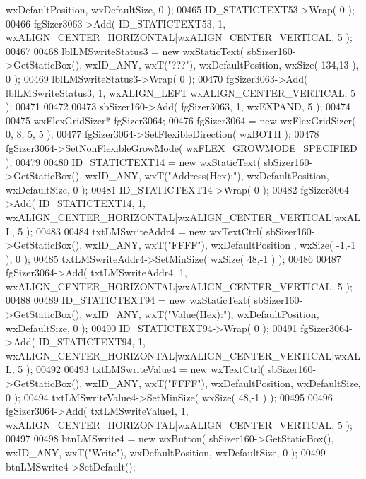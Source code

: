\begin{DoxyCode}
      wxDefaultPosition, wxDefaultSize, 0 );
00465     ID_STATICTEXT53->Wrap( 0 );
00466     fgSizer3063->Add( ID_STATICTEXT53, 1, wxALIGN\_CENTER\_HORIZONTAL|wxALIGN\_CENTER\_VERTICAL, 5 );
00467     
00468     lblLMSwriteStatus3 = \textcolor{keyword}{new} wxStaticText( sbSizer160->GetStaticBox(), wxID\_ANY, wxT(\textcolor{stringliteral}{"???"}), 
      wxDefaultPosition, wxSize( 134,13 ), 0 );
00469     lblLMSwriteStatus3->Wrap( 0 );
00470     fgSizer3063->Add( lblLMSwriteStatus3, 1, wxALIGN\_LEFT|wxALIGN\_CENTER\_VERTICAL, 5 );
00471     
00472     
00473     sbSizer160->Add( fgSizer3063, 1, wxEXPAND, 5 );
00474     
00475     wxFlexGridSizer* fgSizer3064;
00476     fgSizer3064 = \textcolor{keyword}{new} wxFlexGridSizer( 0, 8, 5, 5 );
00477     fgSizer3064->SetFlexibleDirection( wxBOTH );
00478     fgSizer3064->SetNonFlexibleGrowMode( wxFLEX\_GROWMODE\_SPECIFIED );
00479     
00480     ID_STATICTEXT14 = \textcolor{keyword}{new} wxStaticText( sbSizer160->GetStaticBox(), wxID\_ANY, wxT(\textcolor{stringliteral}{"Address(Hex):"}), 
      wxDefaultPosition, wxDefaultSize, 0 );
00481     ID_STATICTEXT14->Wrap( 0 );
00482     fgSizer3064->Add( ID_STATICTEXT14, 1, wxALIGN\_CENTER\_HORIZONTAL|wxALIGN\_CENTER\_VERTICAL|wxALL, 5 );
00483     
00484     txtLMSwriteAddr4 = \textcolor{keyword}{new} wxTextCtrl( sbSizer160->GetStaticBox(), wxID\_ANY, wxT(\textcolor{stringliteral}{"FFFF"}), wxDefaultPosition
      , wxSize( -1,-1 ), 0 );
00485     txtLMSwriteAddr4->SetMinSize( wxSize( 48,-1 ) );
00486     
00487     fgSizer3064->Add( txtLMSwriteAddr4, 1, wxALIGN\_CENTER\_HORIZONTAL|wxALIGN\_CENTER\_VERTICAL, 5 );
00488     
00489     ID_STATICTEXT94 = \textcolor{keyword}{new} wxStaticText( sbSizer160->GetStaticBox(), wxID\_ANY, wxT(\textcolor{stringliteral}{"Value(Hex):"}), 
      wxDefaultPosition, wxDefaultSize, 0 );
00490     ID_STATICTEXT94->Wrap( 0 );
00491     fgSizer3064->Add( ID_STATICTEXT94, 1, wxALIGN\_CENTER\_HORIZONTAL|wxALIGN\_CENTER\_VERTICAL|wxALL, 5 );
00492     
00493     txtLMSwriteValue4 = \textcolor{keyword}{new} wxTextCtrl( sbSizer160->GetStaticBox(), wxID\_ANY, wxT(\textcolor{stringliteral}{"FFFF"}), 
      wxDefaultPosition, wxDefaultSize, 0 );
00494     txtLMSwriteValue4->SetMinSize( wxSize( 48,-1 ) );
00495     
00496     fgSizer3064->Add( txtLMSwriteValue4, 1, wxALIGN\_CENTER\_HORIZONTAL|wxALIGN\_CENTER\_VERTICAL, 5 );
00497     
00498     btnLMSwrite4 = \textcolor{keyword}{new} wxButton( sbSizer160->GetStaticBox(), wxID\_ANY, wxT(\textcolor{stringliteral}{"Write"}), wxDefaultPosition, 
      wxDefaultSize, 0 );
00499     btnLMSwrite4->SetDefault(); 

\end{DoxyCode}
